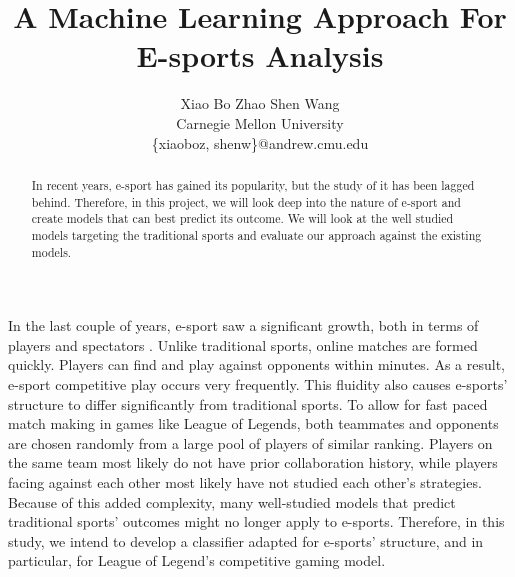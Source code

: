 \documentclass[times, 10pt,twocolumn]{article}
\begin{document}
\title{A Machine Learning Approach For E-sports Analysis}

\author{
	Xiao Bo Zhao \qquad Shen Wang\\
	Carnegie Mellon University\\
	\{xiaoboz, shenw\}@andrew.cmu.edu\\
}

\maketitle
\thispagestyle{empty}

\begin{abstract}
	In recent years, e-sport has gained its popularity, but the study of it has been lagged behind. Therefore, in this project, we will look deep into the nature of e-sport and create models that can best predict its outcome. We will look at the well studied models targeting the traditional sports and evaluate our approach against the existing models.
\end{abstract}



In the last couple of years, e-sport saw a significant growth, both in terms of players and spectators \cite{Witkowski:2013:ERC:2513002.2513008}. Unlike traditional sports, online matches are formed quickly. Players can find and play against opponents within minutes. As a result, e-sport competitive play occurs very frequently. This fluidity also causes e-sports’ structure to differ significantly from traditional sports. To allow for fast paced match making in games like League of Legends, both teammates and opponents are chosen randomly from a large pool of players of similar ranking. Players on the same team most likely do not have prior collaboration history, while players facing against each other most likely have not studied each other’s strategies. Because of this added complexity, many well-studied models that predict traditional sports’ outcomes might no longer apply to e-sports. Therefore, in this study, we intend to develop a classifier adapted for e-sports’ structure, and in particular, for League of Legend’s competitive gaming model.
\end{document}
